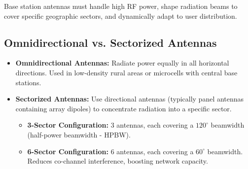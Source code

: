 \documentclass[12pt,a4paper]{article}
\begin{document}
Base station antennas must handle high RF power, shape radiation beams to cover specific geographic sectors, and dynamically adapt to user distribution.

\subsection{Omnidirectional vs. Sectorized Antennas}
\begin{itemize}[leftmargin=*, itemsep=3.5pt]
  \item \textbf{Omnidirectional Antennas:} Radiate power equally in all horizontal directions. Used in low-density rural areas or microcells with central base stations.
  \item \textbf{Sectorized Antennas:} Use directional antennas (typically panel antennas containing array dipoles) to concentrate radiation into a specific sector.
    \begin{itemize}[leftmargin=*, itemsep=2pt, topsep=2pt]
      \item \textbf{3-Sector Configuration:} 3 antennas, each covering a $120^\circ$ beamwidth (half-power beamwidth - HPBW).
      \item \textbf{6-Sector Configuration:} 6 antennas, each covering a $60^\circ$ beamwidth. Reduces co-channel interference, boosting network capacity.
    \end{itemize}
\end{itemize}

\begin{tcolorbox}[tikzbox, title={Base Station Sectorization Patterns}]
\centering
{}
\end{tcolorbox}
\end{document}
